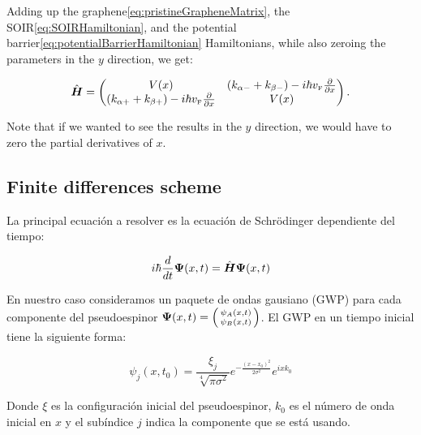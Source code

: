 Adding up the graphene\eqref{eq:pristineGrapheneMatrix}, the SOIR\eqref{eq:SOIRHamiltonian}, and the potential barrier\eqref{eq:potentialBarrierHamiltonian} Hamiltonians, while also zeroing the parameters in the $y$ direction, we get:

\begin{equation}
    \label{eq:hybridHamiltonian}
    \hat{\mbox{\boldmath $H$}}=
    \begin{pmatrix}
        V(x)                                                                                   & \left(k_{\alpha-}+k_{\beta-}\right)-i\hbar v_{\mbox{\tiny F}}\frac{\partial}{\partial x} \\
        \left(k_{\alpha+}+k_{\beta+}\right)-i\hbar v_{\mbox{\tiny F}}\frac{\partial}{\partial x} & V(x)
    \end{pmatrix}.
\end{equation}

Note that if we wanted to see the results in the $y$ direction, we would have to zero the partial derivatives of $x$.

\subsection{Finite differences scheme}\label{subsec:finite-differences-scheme}

La principal ecuación a resolver es la ecuación de Schrödinger dependiente del tiempo:

\begin{equation}
    \label{eq:schrodingerTimeDependent}
    i\hbar \frac{d}{dt}\mbox{\boldmath $\Psi$}(x,t) = \hat{\mbox{\boldmath $H$}}\mbox{\boldmath $\Psi$}(x,t)
\end{equation}

En nuestro caso consideramos un paquete de ondas gausiano (GWP) para cada componente del pseudoespinor $\bn{\Psi}(x,t)=\begin{psmallmatrix*}
                                                                                                                           \psi_A(x,t)\\\psi_B(x,t)
\end{psmallmatrix*}$.
El GWP en un tiempo inicial tiene la siguiente forma:

\begin{equation}
    \label{eq:GWP}
    \psi_j(x,t_0)=\frac{\xi_j}{\sqrt[4]{\pi\sigma^2}}e^{-\frac{(x-x_0)^2}{2\sigma^2}}e^{ixk_0}
\end{equation}

\noindent Donde $\xi$ es la configuración inicial del pseudoespinor, $k_0$ es el número de onda inicial en $x$ y el subíndice $j$ indica la componente que se está usando.

